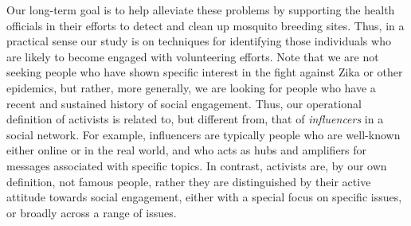 \documentclass[runningheads]{llncs}
\begin{document}

Our long-term goal is to help alleviate these problems by supporting the health officials in their efforts to detect and clean up mosquito breeding sites.
Thus, in a practical sense our study is on techniques for identifying those individuals who are likely to become engaged with volunteering efforts.
Note that we are not seeking people who have shown  specific interest in the fight against Zika or other epidemics, but rather, more generally, we are looking for people who have a recent and sustained history of social engagement. 
%
Thus, our operational definition of activists is related to, but different from, that of \textit{influencers} in a social network. 
For example, influencers are typically people who are well-known either online or in the real world, and who acts as hubs and amplifiers for messages associated with specific topics. 
In contrast, activists are, by our own definition, not famous people, rather they are distinguished by their active attitude towards social engagement, either with a special focus on specific issues, or broadly across a range of issues.
\end{document}
